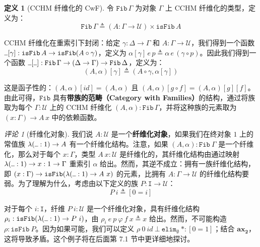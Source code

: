 \documentclass{ctexrep}
\theoremstyle{plain}
\theoremstyle{definition}
\newtheorem{definition}[theorem]{定义}
\theoremstyle{remark}
\newtheorem{remark}[theorem]{评论}
\newcommand{\ax}[1]{\mathbf{ax_{#1}}}
\newcommand{\ul}{{\rule[0ex]{0.5em}{0.4pt}}} %
\begin{document}
\begin{definition}[CCHM 纤维化的 CwF]
令 $\mathtt{Fib}\,\Gamma$ 为对象 $\Gamma$ 上 CCHM 纤维化的类型，定义为：
\begin{equation}
\mathtt{Fib}\,\Gamma \triangleq (A : \Gamma \to \mathcal{U}) \times \mathtt{isFib}\,A
\end{equation}

CCHM 纤维化在重索引下封闭：给定 $\gamma : \Delta \to \Gamma$ 和 $A : \Gamma \to \mathcal{U}$，我们得到一个函数 $\ul [\gamma] : \mathtt{isFib}\,A \to \mathtt{isFib}(A \circ \gamma)$，定义为 $\alpha[\gamma]\,e\,p \triangleq \alpha\,e\,(\gamma \circ p)$。因此我们得到一个函数 $\ul [\ul ] : \mathtt{Fib}\,\Gamma \to (\Delta \to \Gamma) \to \mathtt{Fib}\,\Delta$，定义为：
\begin{equation}
(A, \alpha)[\gamma] \triangleq (A \circ \gamma, \alpha[\gamma])
\end{equation}

这是函子性的：$(A, \alpha)[id] = (A, \alpha)$ 且 $(A, \alpha)[g \circ f] = (A, \alpha)[g][f]$。由此可得，$\mathtt{Fib}$ 具有\textbf{带族的范畴（Category with Families）}的结构，通过将族取为每个 $\Gamma : \mathcal{U}$ 上的 CCHM 纤维化 $(A, \alpha) : \mathtt{Fib}\,\Gamma$，并将这种族的元素取为 $(x : \Gamma) \to A\,x$ 中的依赖函数。
\end{definition}

\begin{remark}[纤维化对象]
我们说 $A : \mathcal{U}$ 是一个\textbf{纤维化对象}，如果我们在终对象 $1$ 上的常值族 $\lambda(\ul  : 1) \to A$ 有一个纤维化结构。注意，如果 $(A, \alpha) : \mathtt{Fib}\ \Gamma$ 是一个纤维化，那么对于每个 $x : \Gamma$，类型 $A\ x : \mathcal{U}$ 是纤维化的，其纤维化结构由通过映射 $\lambda(\ul  : 1) \to x : 1 \to \Gamma$ 重索引 $\alpha$ 给出。然而，其逆不成立：拥有一族纤维化结构，即 $(x : \Gamma) \to \mathtt{isFib}(\lambda(\ul  : 1) \to A\ x)$ 的元素，比拥有 $A : \Gamma \to \mathcal{U}$ 的纤维化结构要弱。为了理解为什么，考虑由以下定义的族 $P : \mathtt{I} \to \mathcal{U}$：
\begin{equation}
P\ i \triangleq [0 = i]
\end{equation}

对于每个 $i : \mathtt{I}$，纤维 $P\ i : \mathcal{U}$ 是一个纤维化对象，具有纤维化结构 $\rho_i : \mathtt{isFib}(\lambda(\ul  : 1) \to P\ i)$，由 $\rho_i\ e\ p\ \varphi\ f\ x \triangleq x$ 给出。然而，不可能构造 $\rho : \mathtt{isFib}\ P$。因为如果可能，我们可以定义 $\rho\ 0\ id\ \bot\ \mathtt{elim}_\emptyset\ \ast : [0 = 1]$；结合 $\ax{2}$，这将导致矛盾。这个例子将在后面第 7.1 节中更详细地探讨。
\end{remark}
\end{document}
